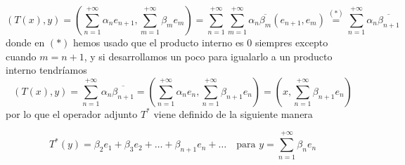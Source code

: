 \begin{ejercicio}
    \begin{equation*}
        ( T(x), y ) = \left( \sum_{n=1}^{+\infty} \alpha_n e_{n+1}, \sum_{m=1}^{+\infty} \beta_m e_m \right) = \sum_{n=1}^{+\infty} \sum_{m=1}^{+\infty} \alpha_n \overline{\beta_m} ( e_{n+1}, e_m )\overset{(*)}{=} \sum_{n=1}^{+\infty} \alpha_n \overline{\beta_{n+1}}
    \end{equation*}
    donde en $(*)$ hemos usado que el producto interno es $0$ siempres excepto cuando $m=n+1$, y si desarrollamos un poco para igualarlo a un producto interno tendríamos
    \begin{equation*}
        ( T(x), y )=  \sum_{n=1}^{+\infty} \alpha_n \overline{\beta_{n+1}}=\left( \sum_{n=1}^{+\infty} \alpha_n e_n, \sum_{n=1}^{+\infty} \beta_{n+1} e_n \right)=\left(x, \sum_{n=1}^{+\infty} \beta_{n+1} e_n\right)
    \end{equation*}
    por lo que el operador adjunto $T^*$ viene definido de la siguiente manera

    \begin{equation*}
        T^*(y) = \beta_2 e_1 + \beta_3 e_2 + \dots + \beta_{n+1} e_n + \dots \quad \text{para } y = \sum_{n=1}^{+\infty} \beta_n e_n
    \end{equation*}
\end{ejercicio}

